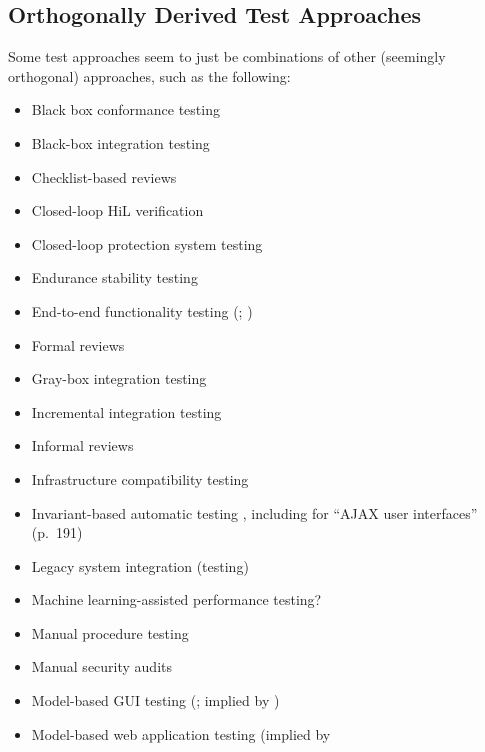 \subsection{Orthogonally Derived Test Approaches}
\label{chap:testing:sec:orthogonal-tests}
Some test approaches seem to just be combinations of other (seemingly
orthogonal) approaches, such as the following:
\begin{itemize}
      \item Black box conformance testing \citep[p.~25]{JardEtAl1999}
      \item Black-box integration testing \citep[p.~345-346]{SakamotoEtAl2013}
      \item Checklist-based reviews \citepISTQB{}
      \item Closed-loop HiL verification \citep[p.~6]{PreußeEtAl2012}
      \item Closed-loop protection system testing \citep[p.~331]{ForsythEtAl2004}
      \item Endurance stability testing \citep[p.~55]{Firesmith2015}
      \item End-to-end functionality testing (\citealp[p.~20]{IEEE2021};
            \citealp[Tab.~2]{Gerrard2000a})
      \item Formal reviews \citepISTQB{}
      \item Gray-box integration testing \citep[p.~344]{SakamotoEtAl2013}
      \item Incremental integration testing \citep[p.~601]{SharmaEtAl2021}
      \item Informal reviews \citepISTQB{}
      \item Infrastructure compatibility testing \citep[p.~53]{Firesmith2015}
      \item Invariant-based automatic testing
            \citep[pp.~184-185,~Tab.~21]{DoğanEtAl2014}, including for
            ``AJAX user interfaces'' (p.~191)
      \item Legacy system integration (testing) \citep[Tab.~2]{Gerrard2000a}
      \item Machine learning-assisted performance testing? \citep{Moghadam2019}
      \item Manual procedure testing \citep[p.~47]{Firesmith2015}
      \item Manual security audits \citep[p.~28]{Gerrard2000b}
      \item Model-based GUI testing (\citealp[Tab.~1]{DoğanEtAl2014}; implied
            by \citealp[p.~356]{SakamotoEtAl2013})
      \item Model-based web application testing (implied by

\end{itemize}
